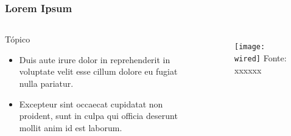 \begin{frame}
    \frametitle{Lorem Ipsum}
    
    \begin{columns}
        \begin{block}{Tópico}
        \begin{itemize}
            \item Duis aute irure dolor in reprehenderit in voluptate velit esse cillum dolore eu fugiat nulla pariatur.\cite{example_article}
        
            \item Excepteur sint occaecat cupidatat non proident, sunt in culpa qui officia deserunt mollit anim id est laborum.
        \end{itemize}
        \end{block}

        \begin{figure}
            \centering \texttt{[image: wired]}
            \tiny Fonte: xxxxxx
        \end{figure}
    \end{columns}
\end{frame}